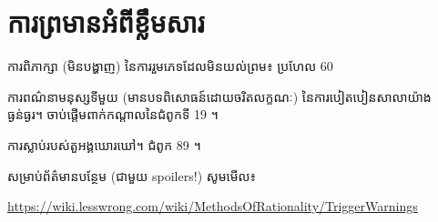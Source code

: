 \RequirePackage[pdf]{layout/hp-book}

\usepackage{fontspec}
\usepackage{polyglossia}
\setmainlanguage{english}

\newfontfamily{}
\usepackage[Latin,Khmer]{ucharclasses}


{
\pagestyle{empty}



\chapter*{ការព្រមានអំពីខ្លឹមសារ}
\thispagestyle{empty}

ការពិភាក្សា (មិនបង្ហាញ) នៃការរួមភេទដែលមិនយល់ព្រម៖ ប្រហែល 60%

ការពណ៌នាមនុស្សទីមួយ (មានបទពិសោធន៍ដោយចរិតលក្ខណៈ) នៃការបៀតបៀនសាលាយ៉ាងធ្ងន់ធ្ងរ។ ចាប់ផ្តើមពាក់កណ្តាលនៃជំពូកទី 19 ។

ការស្លាប់របស់តួអង្គឃោរឃៅ។ ជំពូក 89 ។

សម្រាប់ព័ត៌មានបន្ថែម (ជាមួយ spoilers!) សូមមើល៖

\begin{center}\url{https://wiki.lesswrong.com/wiki/MethodsOfRationality/TriggerWarnings}\end{center}


\cleartorecto
}
\setcounter{page}{1}


